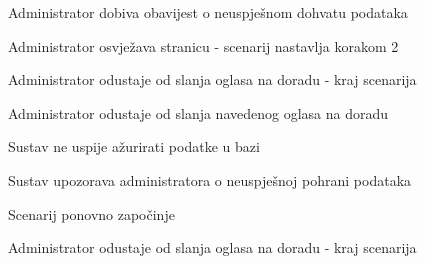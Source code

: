 \begin{packed_item}
\begin{packed_item}
\begin{packed_enum}
								\item Administrator dobiva obavijest o neuspješnom dohvatu podataka
								\item
									\begin{packed_enum}
										\item Administrator osvježava stranicu - scenarij nastavlja korakom 2
										\item Administrator odustaje od slanja oglasa na doradu - kraj scenarija
									\end{packed_enum}	
							\end{packed_enum}
							\item[5.a]  Administrator odustaje od slanja navedenog oglasa na doradu
							\item[6.a] Sustav ne uspije ažurirati podatke u bazi
							\item[] \begin{packed_enum}
								\item Sustav upozorava administratora o neuspješnoj pohrani podataka 
								\item
									\begin{packed_enum}
										\item Scenarij ponovno započinje
										\item Administrator odustaje od slanja oglasa na doradu - kraj scenarija
									\end{packed_enum}
								\end{packed_enum}					
						\end{packed_item}
					\end{packed_item}

